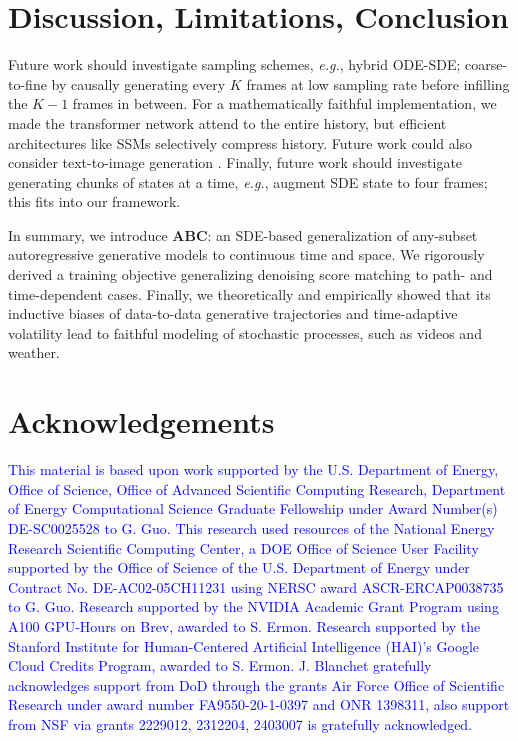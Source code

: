 \documentclass{article}
\begin{document}



\section{Discussion, Limitations, Conclusion}
Future work should investigate sampling schemes, \textit{e.g.}, hybrid ODE-SDE; coarse-to-fine by causally generating every $K$ frames at low sampling rate before infilling the $K-1$ frames in between.
For a mathematically faithful implementation, we made the transformer network attend to the entire history, but efficient architectures like SSMs \cite{gu2023mamba} selectively compress history.
Future work could also consider text-to-image generation \cite{rombach2022high}.
Finally, future work should investigate generating chunks of states at a time, \textit{e.g.}, augment SDE state to four frames; this fits into our framework.%

In summary, we introduce \textbf{ABC}: an SDE-based generalization of any-subset autoregressive generative models to continuous time and space. We rigorously derived a training objective generalizing denoising score matching to path- and time-dependent cases. Finally, we theoretically and empirically showed that its inductive biases of data-to-data generative trajectories and time-adaptive volatility lead to faithful modeling of stochastic processes, such as videos and weather.




\clearpage

\section*{Acknowledgements}

\textcolor{blue}{
This material is based upon work supported by the U.S. Department of Energy, Office of Science, Office of Advanced Scientific Computing Research, Department of Energy Computational Science Graduate Fellowship under Award Number(s) DE-SC0025528 to G. Guo.
This research used resources of the National Energy Research Scientific Computing Center, a DOE Office of Science User Facility supported by the Office of Science of the U.S. Department of Energy under Contract No. DE-AC02-05CH11231 using NERSC award ASCR-ERCAP0038735 to G. Guo.
Research supported by the NVIDIA Academic Grant Program using A100 GPU-Hours on Brev, awarded to S. Ermon.
Research supported by the Stanford Institute for Human-Centered Artificial Intelligence (HAI)'s Google Cloud Credits Program, awarded to S. Ermon.
J. Blanchet gratefully acknowledges support from DoD through the grants Air Force Office of Scientific Research under award number FA9550-20-1-0397 and ONR 1398311, also support from NSF via grants 2229012, 2312204, 2403007 is gratefully acknowledged.
}
\end{document}
